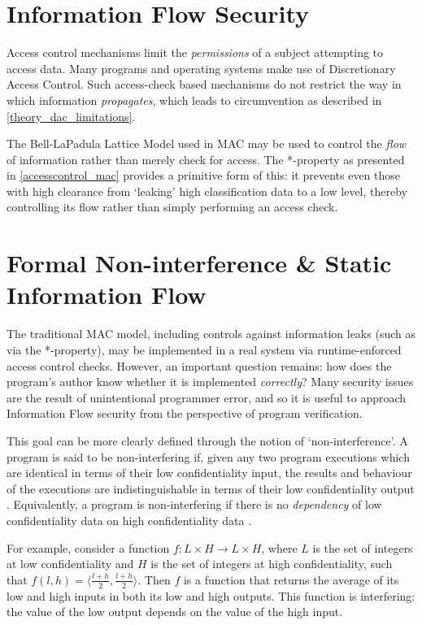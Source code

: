 \section{Information Flow Security}

Access control mechanisms limit the \textit{permissions} of a subject attempting to access data. Many programs and operating systems make use of Discretionary Access Control. Such access-check based mechanisms do not restrict the way in which information \textit{propagates}, which leads to circumvention as described in \ref{theory_dac_limitations}.

The Bell-LaPadula Lattice Model used in MAC may be used to control the \textit{flow} of information rather than merely check for access. The *-property as presented in \ref{accesscontrol_mac} provides a primitive form of this: it prevents even those with high clearance from `leaking' high classification data to a low level, thereby controlling its flow rather than simply performing an access check.

\section{Formal Non-interference \& Static Information Flow} \label{theory_if_noninterference}

The traditional MAC model, including controls against information leaks (such as via the *-property), may be implemented in a real system via runtime-enforced access control checks. However, an important question remains: how does the program's author know whether it is implemented \textit{correctly}? Many security issues are the result of unintentional programmer error, and so it is useful to approach Information Flow security from the perspective of program verification.

This goal can be more clearly defined through the notion of `non-interference'. A program is said to be non-interfering if, given any two program executions which are identical in terms of their low confidentiality input, the results and behaviour of the executions are indistinguishable in terms of their low confidentiality output \cite{sabelfeld2003if}. Equivalently, a program is non-interfering if there is no \textit{dependency} of low confidentiality data on high confidentiality data \cite{cohen1977declassification}.

For example, consider a function $ f: L \times H \rightarrow L \times H $, where $ L $ is the set of integers at low confidentiality and $ H $ is the set of integers at high confidentiality, such that $ f(l, h) = \langle \frac{l + h}{2}, \frac{l + h}{2} \rangle $. Then $ f $ is a function that returns the average of its low and high inputs in both its low and high outputs. This function is interfering: the value of the low output depends on the value of the high input.

